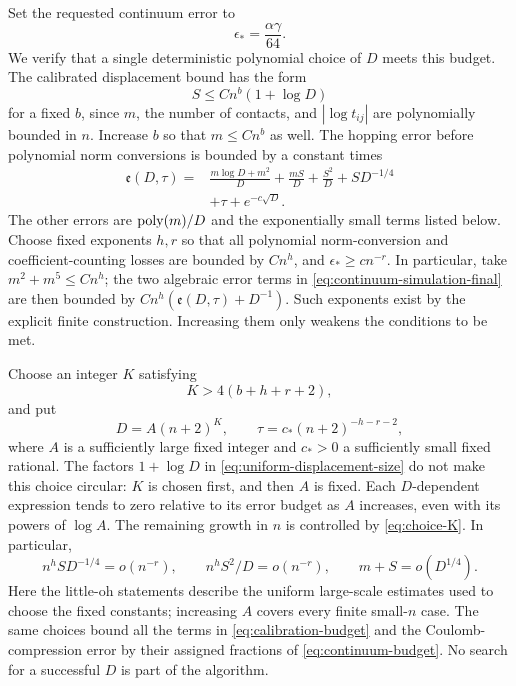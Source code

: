 Set the requested continuum error to
\begin{equation}\label{eq:continuum-budget}
\epsilon_* = \frac{\alpha\gamma}{64}.
\end{equation}
We verify that a single deterministic polynomial choice of $D$ meets this budget. The calibrated displacement bound has the form
\begin{equation}\label{eq:uniform-displacement-size}
S\le C n^b(1+\log D)
\end{equation}
for a fixed $b$, since $m$, the number of contacts, and $|\log t_{ij}|$ are polynomially bounded in $n$. Increase $b$ so that $m\le Cn^b$ as well. The hopping error before polynomial norm conversions is bounded by a constant times
\begin{equation}\label{eq:calibration-budget}
\begin{split}
\mathfrak e(D,\tau)={}&
\frac{m\log D+m^2}{D}+\frac{mS}{D}
+\frac{S^2}{D}+S D^{-1/4}\\
&+\tau+e^{-c\sqrt D}.
\end{split}
\end{equation}
The other errors are $\operatorname{poly}(m)/D$ and the exponentially small terms listed below. Choose fixed exponents $h,r$ so that all polynomial norm-conversion and coefficient-counting losses are bounded by $Cn^h$, and $\epsilon_*\ge c n^{-r}$. In particular, take $m^2+m^5\le Cn^h$; the two algebraic error terms in \cref{eq:continuum-simulation-final} are then bounded by $Cn^h(\mathfrak e(D,\tau)+D^{-1})$. Such exponents exist by the explicit finite construction. Increasing them only weakens the conditions to be met.

Choose an integer $K$ satisfying
\begin{equation}\label{eq:choice-K}
K>4(b+h+r+2),
\end{equation}
and put
\begin{equation}\label{eq:choice-D}
D=A(n+2)^K,
\qquad
\tau=c_*(n+2)^{-h-r-2},
\end{equation}
where $A$ is a sufficiently large fixed integer and $c_*>0$ a sufficiently small fixed rational. The factors $1+\log D$ in \cref{eq:uniform-displacement-size} do not make this choice circular: $K$ is chosen first, and then $A$ is fixed. Each $D$-dependent expression tends to zero relative to its error budget as $A$ increases, even with its powers of $\log A$. The remaining growth in $n$ is controlled by \cref{eq:choice-K}. In particular,
\[
n^h S D^{-1/4}=o(n^{-r}),\qquad
n^h S^2/D=o(n^{-r}),\qquad
m+S=o(D^{1/4}).
\]
Here the little-oh statements describe the uniform large-scale estimates used to choose the fixed constants; increasing $A$ covers every finite small-$n$ case. The same choices bound all the terms in \cref{eq:calibration-budget} and the Coulomb-compression error by their assigned fractions of \cref{eq:continuum-budget}. No search for a successful $D$ is part of the algorithm.

